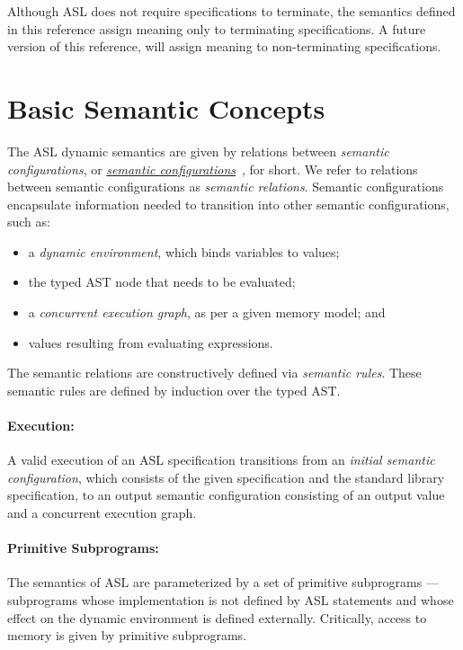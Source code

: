 Although ASL does not require specifications to terminate, the semantics defined in this
reference assign meaning only to terminating specifications.
A future version of this reference, will assign meaning to non-terminating specifications.

\section{Basic Semantic Concepts}
The ASL dynamic semantics are given by relations between \emph{semantic configurations},
or \hyperlink{def-configuration}{\emph{semantic configurations}}~\cite{SemanticsWithApplicationsBook}, for short.
We refer to relations between semantic configurations as \emph{semantic relations}.
Semantic configurations encapsulate information needed to transition into other semantic configurations, such as:
\begin{itemize}
  \item a \emph{dynamic environment}, which binds variables to values;
  \item the typed AST node that needs to be evaluated;
  \item a \emph{concurrent execution graph}, as per a given memory model; and
  \item values resulting from evaluating expressions.
\end{itemize}
The semantic relations are constructively defined via \emph{semantic rules}.
These semantic rules are defined by induction over the typed AST.

\paragraph{Execution:}
A valid execution of an ASL specification transitions from an \emph{initial semantic configuration},
which consists of the given specification and the standard library specification, to an output semantic configuration
consisting of an output value and a concurrent execution graph.

\paragraph{Primitive Subprograms:}
The semantics of ASL are parameterized by a set of primitive subprograms ---
subprograms whose implementation is not defined by ASL statements and whose effect on the dynamic environment
is defined externally. Critically, access to memory is given by primitive subprograms.

